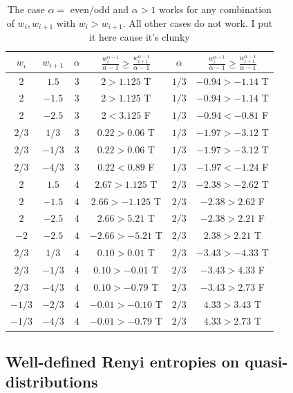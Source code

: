 \documentclass[pra,
aps,
twocolumn,
superscriptaddress,
groupedaddress,
nofootinbib,
reprint
]{revtex4-1}
\begin{document}
\begin{table}[h]
  \def\arraystretch{1.5}
  \centering
  \begin{tabular}{c|c|c|c||c|c}
    $w_i$ & $w_{i+1}$ & $\alpha$ & $\frac{w_i^{\alpha-1}}{\alpha-1} \geq \frac{w_{i+1}^{\alpha-1}}{\alpha-1}$ & $\alpha$ & $\frac{w_i^{\alpha-1}}{\alpha-1} \geq \frac{w_{i+1}^{\alpha-1}}{\alpha-1}$ \\[0.5ex]\hline
    $2$ & $1.5$  & $3$ & $2 > 1.125$ T & $1/3$ & $-0.94 > -1.14$ T \\
    $2$ & $-1.5$ & $3$ & $2 > 1.125$ T & $1/3$ & $-0.94 > -1.14$ T \\
    $2$ & $-2.5$ & $3$ & $2 < 3.125$ F & $1/3$ & $-0.94 < -0.81$ F \\[0.5ex]\hline
    $2/3$ & $1/3$  & $3$ & $0.22 > 0.06$ T & $1/3$ & $-1.97 > -3.12$ T \\
    $2/3$ & $-1/3$ & $3$ & $0.22 > 0.06$ T & $1/3$ & $-1.97 > -3.12$ T \\
    $2/3$ & $-4/3$ & $3$ & $0.22 < 0.89$ F & $1/3$ & $-1.97 < -1.24$ F \\[0.5ex]\hline
    $2$ & $1.5$  & $4$ & $2.67 > 1.125$ T & $2/3$ & $-2.38 > -2.62$ T \\
    $2$ & $-1.5$ & $4$ & $2.66 > -1.125$ T & $2/3$ & $-2.38 > 2.62$ F \\
    $2$ & $-2.5$ & $4$ & $2.66 > 5.21$ T & $2/3$ & $-2.38 > 2.21$ F \\
    $-2$ & $-2.5$ & $4$ & $-2.66 > -5.21$ T & $2/3$ & $2.38 > 2.21$ T \\[0.5ex]\hline
    $2/3$ & $1/3$  & $4$ & $0.10 > 0.01$ T & $2/3$ & $-3.43 > -4.33$ T \\
    $2/3$ & $-1/3$ & $4$ & $0.10 > -0.01$ T & $2/3$ & $-3.43 > 4.33$ F \\
    $2/3$ & $-4/3$ & $4$ & $0.10 > -0.79$ T & $2/3$ & $-3.43 > 2.73$ F \\
    $-1/3$ & $-2/3$ & $4$ & $-0.01 > -0.10$ T & $2/3$ & $4.33 > 3.43$ T \\
    $-1/3$ & $-4/3$ & $4$ & $-0.01 > -0.79$ T & $2/3$ & $4.33 > 2.73$ T
  \end{tabular}
  \caption{ The case $\alpha=$ even$/$odd and $\alpha > 1$ works for any combination of $w_i, w_{i+1}$ with $w_i > w_{i+1}$. 
  All other cases do not work.
  I put it here cause it's clunky}
  \label{tab:test}
\end{table}


\subsection{Well-defined Renyi entropies on quasi-distributions}
\end{document}
